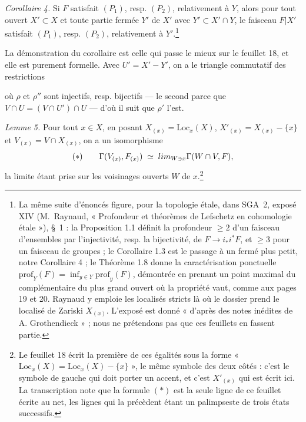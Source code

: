 \documentclass[11pt,a4paper]{article}
\begin{document}
\emph{Corollaire 4.} Si $F$ satisfait $(P_{1})$, resp. $(P_{2})$, relativement à
$Y$, alors pour tout ouvert $X' \subset X$ et toute partie fermée $Y'$ de $X'$
avec $Y' \subset X' \cap Y$, le faisceau $F|X'$ satisfait $(P_{1})$, resp.
$(P_{2})$, relativement à $Y'$.\footnote{La même suite d'énoncés figure,
pour la topologie étale, dans SGA~2, exposé XIV (M.~Raynaud, « Profondeur et
théorèmes de Lefschetz en cohomologie étale »), §~1 : la Proposition 1.1
définit la profondeur $\geqslant 2$ d'un faisceau d'ensembles par
l'injectivité, resp. la bijectivité, de $F \to i_{*}i^{*}F$, et $\geqslant 3$
pour un faisceau de groupes ; le Corollaire 1.3 est le passage à un fermé plus
petit, notre Corollaire 4 ; le Théorème 1.8 donne la caractérisation ponctuelle
$\mathrm{prof}_{Y}(F) = \inf_{y \in Y} \mathrm{prof}_{y}(F)$, démontrée en
prenant un point maximal du complémentaire du plus grand ouvert où la propriété
vaut, comme aux pages 19 et 20. Raynaud y emploie les localisés stricts là où
le dossier prend le localisé de Zariski $X_{(x)}$. L'exposé est donné
« d'après des notes inédites de A. Grothendieck » ; nous ne prétendons pas que
ces feuillets en fassent partie.}

La démonstration du corollaire est celle qui passe le mieux sur le feuillet 18,
et elle est purement formelle. Avec $U' = X' - Y'$, on a le triangle commutatif
des restrictions


où $\rho$ et $\rho''$ sont injectifs, resp. bijectifs — le second parce que
$V \cap U = (V \cap U') \cap U$ — d'où il suit que $\rho'$ l'est.

\emph{Lemme 5.} Pour tout $x \in X$, en posant $X_{(x)} = \mathrm{Loc}_{x}(X)$,
$X'_{(x)} = X_{(x)} - \{x\}$ et $V_{(x)} = V \cap X_{(x)}$, on a un isomorphisme
\[
  (\ast) \qquad
  \Gamma(V_{(x)}, F_{(x)}) \;\simeq\;
  \varinjlim_{W \ni x} \Gamma(W \cap V, F) ,
\]
la limite étant prise sur les voisinages ouverts $W$ de $x$.\footnote{Le
feuillet 18 écrit la première de ces égalités sous la forme
« $\mathrm{Loc}_{x}(X) = \mathrm{Loc}_{x}(X) - \{x\}$ », le même symbole des
deux côtés : c'est le symbole de gauche qui doit porter un accent, et c'est
$X'_{(x)}$ qui est écrit ici. La transcription note que la formule $(\ast)$ est
la seule ligne de ce feuillet écrite au net, les lignes qui la précèdent étant
un palimpseste de trois états successifs.}
\end{document}
